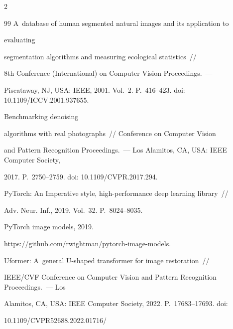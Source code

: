 \begin{multicols}{2}
{{\begin{thebibliography}{99}
    A~database of human segmented natural images and its application to 


evaluating


    segmentation algorithms and measuring ecological statistics~//  


8th  Conference (International) on Computer Vision Proceedings.~--- 


Piscataway, NJ, USA: IEEE, 2001. Vol.~2. P.~416--423. doi: 10.1109/ICCV.2001.937655.


    




     Benchmarking denoising 


algorithms  with     real photographs~// Conference on Computer Vision 


and Pattern Recognition Proceedings.~--- Los Alamitos, CA, USA: IEEE Computer Society, 


2017. P.~2750--2759. doi: 10.1109/CVPR.2017.294.


    






    PyTorch: An Imperative style, high-performance deep learning library~//


    Adv. Neur. Inf., 2019. Vol.~32. P.~8024--8035.


   




     PyTorch image models, 2019.


    {\sf  https://github.com/rwightman/pytorch-image-models}.


    






    Uformer: A~general U-shaped transformer for image restoration~// 


IEEE/CVF Conference on Computer Vision and Pattern Recognition Proceedings.~--- Los 


Alamitos, CA, USA: IEEE Computer Society, 2022. P.~17683--17693. doi: 


10.1109/CVPR52688.2022.01716/



\end{thebibliography}}}
\end{multicols}
